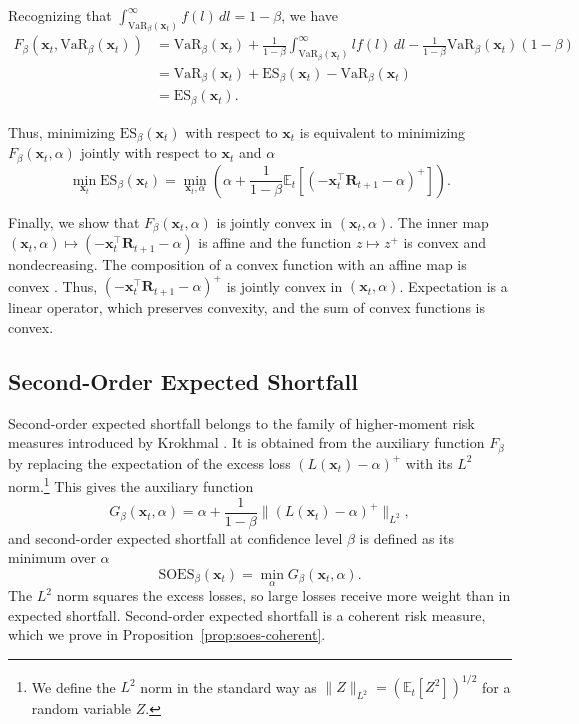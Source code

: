 Recognizing that $\int_{\text{VaR}_\beta(\bm{x}_t)}^\infty f(l) \, dl = 1-\beta$, we have
\begin{align*}
    F_\beta(\bm{x}_t, \text{VaR}_\beta(\bm{x}_t)) &= \text{VaR}_\beta(\bm{x}_t) + \frac{1}{1-\beta} \int_{\text{VaR}_\beta(\bm{x}_t)}^\infty l f(l) \, dl - \frac{1}{1-\beta} \text{VaR}_\beta(\bm{x}_t) (1-\beta) \\
    &= \text{VaR}_\beta(\bm{x}_t) + \text{ES}_\beta(\bm{x}_t) - \text{VaR}_\beta(\bm{x}_t) \\
    &= \text{ES}_\beta(\bm{x}_t).
\end{align*}

Thus, minimizing $\text{ES}_\beta(\bm{x}_t)$ with respect to $\bm{x}_t$ is equivalent to minimizing $F_\beta(\bm{x}_t, \alpha)$ jointly with respect to $\bm{x}_t$ and $\alpha$
\begin{equation} \label{eq:joint_opt}
    \min_{\bm{x}_t} \text{ES}_\beta(\bm{x}_t) = \min_{\bm{x}_t, \alpha} \left( \alpha + \frac{1}{1-\beta} \mathbb{E}_t[(-\bm{x}_t^\top \bm{R}_{t+1} - \alpha)^+] \right).
\end{equation}

Finally, we show that $F_\beta(\bm{x}_t, \alpha)$ is jointly convex in $(\bm{x}_t, \alpha)$. 
The inner map $(\bm{x}_t, \alpha) \mapsto (-\bm{x}_t^\top \bm{R}_{t+1} - \alpha)$ is affine and 
the function $z \mapsto z^+$ is convex and nondecreasing. The composition of a convex function 
with an affine map is convex \cite[Section~3.2.2]{boyd2004convex}. Thus, $(-\bm{x}_t^\top \bm{R}_{t+1} - \alpha)^+$ is 
jointly convex in $(\bm{x}_t, \alpha)$. Expectation is a linear operator, which preserves convexity, and the sum of convex functions is convex.


\subsection{Second-Order Expected Shortfall} \label{app:soes_auxiliary}

Second-order expected shortfall belongs to the family of higher-moment risk measures introduced by Krokhmal
\cite{Krokhmal2007}. It is obtained from the auxiliary function $F_\beta$ by replacing the expectation of the excess
loss $(L(\bm{x}_t) - \alpha)^+$ with its $L^2$ norm.\footnote{ We define the $L^2$ norm in the standard way as $\|Z\|_{L^2} = (\mathbb{E}_t[Z^2])^{1/2}$ for a random variable
$Z$.} This gives the auxiliary function
\begin{equation*}
    G_\beta(\bm{x}_t, \alpha) = \alpha + \frac{1}{1-\beta} \big\| (L(\bm{x}_t) - \alpha)^+ \big\|_{L^2},
\end{equation*}
and second-order expected shortfall at confidence level $\beta$ is defined as its minimum over $\alpha$
\begin{equation} \label{eq:soes_def}
    \text{SOES}_\beta(\bm{x}_t) = \min_{\alpha} G_\beta(\bm{x}_t, \alpha).
\end{equation}
The $L^2$ norm squares the excess losses, so large losses 
receive more weight than in expected shortfall. Second-order expected shortfall is a coherent risk measure, which we prove in Proposition~\ref{prop:soes-coherent}.


